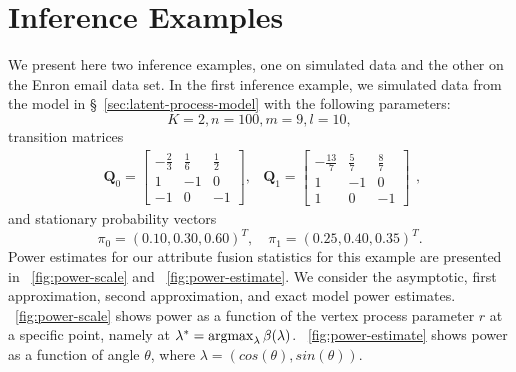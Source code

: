\documentclass[10pt,journal,compsoc]{IEEEtran}
\theoremstyle{definition}
\newcommand{\argmax}{\operatornamewithlimits{argmax}}
\begin{document}
\section{Inference Examples}
We present here two inference examples, one on simulated data and the
other on the Enron email data set. In the first inference example, we
simulated data from the model in \S~\ref{sec:latent-process-model}
with the following parameters:
\begin{equation*}
  K = 2, n = 100, m = 9, l = 10,
\end{equation*}
transition matrices
\begin{equation*}
  \label{eq:55}
  \begin{matrix}
  \mathbf{Q}_0 = \begin{bmatrix}
    -\tfrac{2}{3} & \tfrac{1}{6} & \tfrac{1}{2} \\
    1 & -1 & 0 \\
    -1 & 0 & -1 
  \end{bmatrix},
  & \mathbf{Q}_1 = \begin{bmatrix}
    -\tfrac{13}{7} & \tfrac{5}{7} & \tfrac{8}{7} \\
    1 & -1 & 0 \\
    1 & 0 & -1
  \end{bmatrix}
  \end{matrix},
\end{equation*}
and stationary probability vectors
\begin{equation*}
  \pi_0 = (0.10,0.30,0.60)^{T}, \quad \pi_1 = (0.25,0.40,0.35)^{T}.
\end{equation*}
Power estimates for our attribute fusion statistics for this example
are presented in \figurename~\ref{fig:power-scale} and
\figurename~\ref{fig:power-estimate}. We consider the asymptotic,
first approximation, second approximation, and exact model power
estimates. \figurename~\ref{fig:power-scale} shows power as a function
of the vertex process parameter $r$ at a specific point, namely at
$\lambda^{*} = \argmax_{\lambda} \beta(\lambda)$.
\figurename~\ref{fig:power-estimate} shows power as a function of
angle $\theta$, where $\lambda = (cos(\theta), sin(\theta))$.
\end{document}
